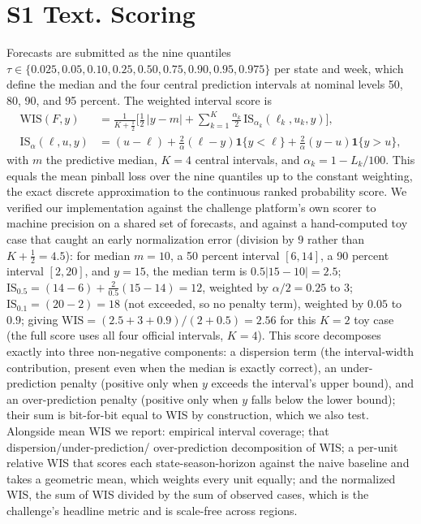 \documentclass[11pt]{article}
\begin{document}
\section*{S1 Text. Scoring}
Forecasts are submitted as the nine quantiles $\tau \in \{0.025, 0.05, 0.10, 0.25, 0.50, 0.75, 0.90,
0.95, 0.975\}$ per state and week, which define the median and the four central prediction intervals
at nominal levels 50, 80, 90, and 95 percent. The weighted interval score is
\[
\begin{aligned}
\mathrm{WIS}(F,y)&=\frac{1}{K+\tfrac12}\Big[\tfrac12\,|y-m| + \sum_{k=1}^{K}\frac{\alpha_k}{2}\,
\mathrm{IS}_{\alpha_k}(\ell_k,u_k,y)\Big],\\[0.35em]
\mathrm{IS}_{\alpha}(\ell,u,y)&=(u-\ell)+\tfrac{2}{\alpha}(\ell-y)\mathbf{1}\{y<\ell\}
+\tfrac{2}{\alpha}(y-u)\mathbf{1}\{y>u\},
\end{aligned}
\]
with $m$ the predictive median, $K=4$ central intervals, and $\alpha_k = 1 - L_k/100$. This equals the
mean pinball loss over the nine quantiles up to the constant weighting, the exact discrete
approximation to the continuous ranked probability score. We verified our implementation against the
challenge platform's own scorer to machine precision on a shared set of forecasts, and against a
hand-computed toy case that caught an early normalization error (division by $9$ rather than
$K+\tfrac12 = 4.5$): for median $m=10$, a 50 percent interval $[6,14]$, a 90 percent interval
$[2,20]$, and $y=15$, the median term is $0.5|15-10|=2.5$; $\mathrm{IS}_{0.5}=(14-6)+\tfrac{2}{0.5}
(15-14)=12$, weighted by $\alpha/2=0.25$ to $3$; $\mathrm{IS}_{0.1}=(20-2)=18$ (not exceeded, so no
penalty term), weighted by $0.05$ to $0.9$; giving $\mathrm{WIS}=(2.5+3+0.9)/(2+0.5)=2.56$ for this
$K=2$ toy case (the full score uses all four official intervals, $K=4$). This score decomposes
exactly into three non-negative components: a dispersion term (the interval-width contribution,
present even when the median is exactly correct), an under-prediction penalty (positive only when
$y$ exceeds the interval's upper bound), and an over-prediction penalty (positive only when $y$ falls
below the lower bound); their sum is bit-for-bit equal to WIS by construction, which we also test.
Alongside mean WIS we report: empirical interval coverage; that dispersion/under-prediction/
over-prediction decomposition of WIS; a per-unit relative WIS
that scores each state-season-horizon against the naive baseline and takes a geometric mean, which
weights every unit equally; and the normalized WIS, the sum of WIS divided by the sum of observed
cases, which is the challenge's headline metric and is scale-free across regions.
\end{document}
